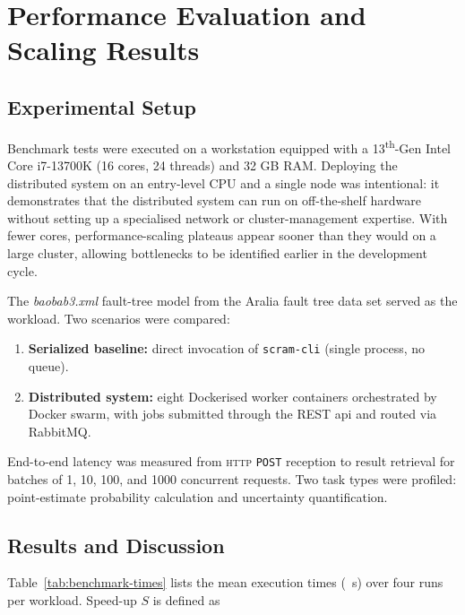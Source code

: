 

\section{Performance Evaluation and Scaling Results}
\label{sec:scaling-results}

\subsection{Experimental Setup}
\label{subsec:exp-setup}

Benchmark tests were executed on a workstation equipped with a 13\textsuperscript{th}-Gen Intel\textsuperscript{\textregistered} Core\textsuperscript{\texttrademark} i7-13700K (16 cores, 24 threads) and 32 GB RAM. Deploying the distributed system on an entry-level CPU and a single node was intentional: it demonstrates that the distributed system can run on off-the-shelf hardware without setting up a specialised network or cluster-management expertise. With fewer cores, performance-scaling plateaus appear sooner than they would on a large cluster, allowing bottlenecks to be identified earlier in the development cycle.

The \textit{baobab3.xml} fault-tree model from the Aralia fault tree data set served as the workload. Two scenarios were compared:

\begin{enumerate}
  \item \textbf{Serialized baseline:} direct invocation of \texttt{scram-cli} (single process, no queue).
  \item \textbf{Distributed system:} eight Dockerised worker containers orchestrated by Docker swarm, with jobs submitted through the REST \acrshort{api} and routed via RabbitMQ.
\end{enumerate}

End-to-end latency was measured from \textsc{http} \texttt{POST} reception to result retrieval for batches of 1, 10, 100, and 1000 concurrent requests. Two task types were profiled: point-estimate probability calculation and uncertainty quantification.

\subsection{Results and Discussion}
\label{subsec:scaling-discussion}

Table~\ref{tab:benchmark-times} lists the mean execution times (\SI{}{\second}) over four runs per workload.  
Speed-up $S$ is defined as


